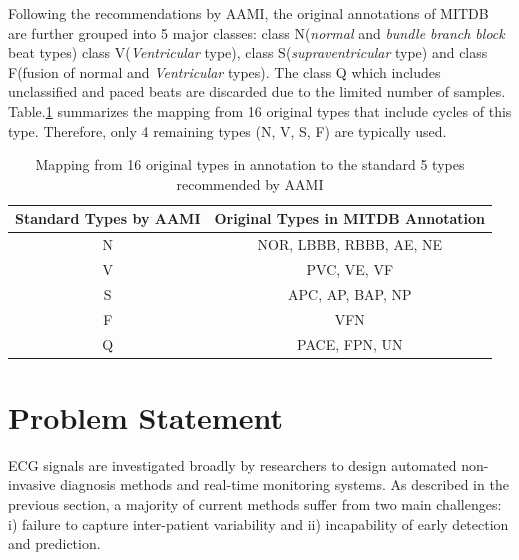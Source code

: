 Following the recommendations by AAMI, the original annotations of MITDB are further grouped into 5 major classes: class N(\textit{normal} and \textit{bundle branch block} beat types) class V(\textit{Ventricular} type), class S(\textit{supraventricular} type) and class F(fusion of normal and \textit{Ventricular} types). The class Q which includes unclassified and paced beats are discarded due to the limited number of samples. Table.\ref{table:grouping_types} summarizes the mapping from 16 original types that include cycles of this type. Therefore, only 4 remaining types (N, V, S, F) are typically used.%

\begin{table}[h]
\centering
\caption{Mapping from 16 original types in annotation to the standard 5 types recommended by AAMI}
\label{table:grouping_types}
\begin{tabular}{|c|c|}
\hline
Standard Types by AAMI & Original Types in MITDB Annotation \\ \hline
N                      & NOR, LBBB, RBBB, AE, NE            \\ \hline
V                      & PVC, VE, VF                        \\ \hline
S                      & APC, AP, BAP, NP                   \\ \hline
F                      & VFN                                \\ \hline
Q                      & PACE, FPN, UN                      \\ \hline
\end{tabular}
\end{table}




\section{Problem Statement}

ECG signals are investigated broadly by researchers to design automated non-invasive diagnosis methods and real-time monitoring systems\cite{Kiranyaz, chen2018predictive, jchen}. As described in the previous section, a majority of current methods suffer from two main challenges: i) failure to capture inter-patient variability and ii) incapability of early detection and prediction. %

